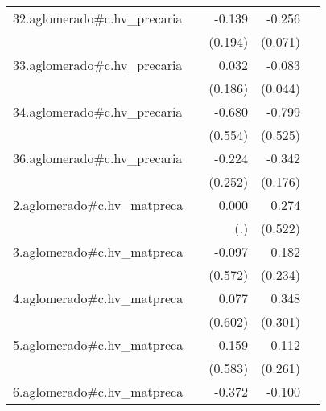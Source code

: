 {\begin{longtable}{l*{4}{D{.}{.}{-1}}}
\addlinespace
32.aglomerado#c.hv\_precaria&                     &      -0.139         &      -0.256\sym{***}&                     \\
            &                     &     (0.194)         &     (0.071)         &                     \\
\addlinespace
33.aglomerado#c.hv\_precaria&                     &       0.032         &      -0.083         &                     \\
            &                     &     (0.186)         &     (0.044)         &                     \\
\addlinespace
34.aglomerado#c.hv\_precaria&                     &      -0.680         &      -0.799         &                     \\
            &                     &     (0.554)         &     (0.525)         &                     \\
\addlinespace
36.aglomerado#c.hv\_precaria&                     &      -0.224         &      -0.342         &                     \\
            &                     &     (0.252)         &     (0.176)         &                     \\
\addlinespace
2.aglomerado#c.hv\_matpreca&                     &       0.000         &       0.274         &                     \\
            &                     &         (.)         &     (0.522)         &                     \\
\addlinespace
3.aglomerado#c.hv\_matpreca&                     &      -0.097         &       0.182         &                     \\
            &                     &     (0.572)         &     (0.234)         &                     \\
\addlinespace
4.aglomerado#c.hv\_matpreca&                     &       0.077         &       0.348         &                     \\
            &                     &     (0.602)         &     (0.301)         &                     \\
\addlinespace
5.aglomerado#c.hv\_matpreca&                     &      -0.159         &       0.112         &                     \\
            &                     &     (0.583)         &     (0.261)         &                     \\
\addlinespace
6.aglomerado#c.hv\_matpreca&                     &      -0.372         &      -0.100         &                     \\

\end{longtable}}
